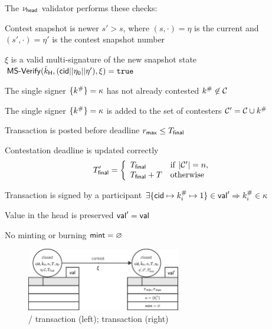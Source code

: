 \begin{samepage}
\noindent The $\nu_\mathsf{head}$ validator performs these checks:
\begin{menumerate}
  \item Contest snapshot is newer $s' > s$, where $(s, \cdot) = \eta$ is the current and $(s', \cdot) = \eta'$ is the contest snapshot number
  \item $\xi$ is a valid multi-signature of the new snapshot state
  $\mathsf{MS\textsf{-}{}Verify}(\tilde{k}_{\mathsf{H}},(\mathsf{cid} || \eta_{0} || \eta'),\xi) = \mathtt{true}$
  \item The single signer $\{k^{\#}\} = \kappa$ has not already contested $k^{\#} \not\in \mathcal{C}$ 
  \item The single signer $\{k^{\#}\} = \kappa$ is added to the set of contesters $\mathcal{C}' = \mathcal{C} \cup k^{\#}$
  \item Transaction is posted before deadline $r_{\mathsf{max}} \leq T_{\mathsf{final}}$
  \item Contestation deadline is updated correctly
     \[
       T_{\mathsf{final}}' = \left\{\begin{array}{ll}
                           T_{\mathsf{final}}     & \mathrm{if} ~ |\mathcal{C}'| = n, \\
                           T_{\mathsf{final}} + T & \mathrm{otherwise}
                         \end{array}\right.
    \]
  \item Transaction is signed by a participant $\exists \{\mathsf{cid} \mapsto k^{\#}_{i} \mapsto 1\} \in \mathsf{val}' \Rightarrow k^{\#}_{i} \in \kappa$
  \item Value in the head is preserved $\mathsf{val}' = \mathsf{val}$
  \item No minting or burning $\mathsf{mint} = \varnothing$
\end{menumerate}
\end{samepage}

\begin{figure}[h]
  \centering
  \includegraphics[width=0.6\textwidth]{figures/SM-contest.pdf}
  \caption{\mtxClose{}/\mtxContest{} transaction (left); \mtxContest{}
    transaction (right)}\label{fig:SM-contest}
\end{figure}

